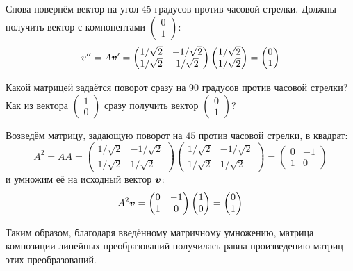 \documentclass[a4paper,12pt]{article}
\begin{document}
\begin{remark}
    Снова повернём вектор на угол $45$ градусов против часовой стрелки.
    Должны получить вектор с компонентами $\left(\begin{smallmatrix}0 \\ 1\end{smallmatrix}\right)$:
    \[
      v''
      = A \boldsymbol v'
      = \begin{pmatrix}
          1/\sqrt{2} & -1/\sqrt{2}\\
          1/\sqrt{2} & 1/\sqrt{2}
        \end{pmatrix}
        \begin{pmatrix}
          1/\sqrt{2} \\ 1/\sqrt{2}
        \end{pmatrix}
      = \begin{pmatrix}
          0 \\ 1
        \end{pmatrix}
    \]
    
    Какой матрицей задаётся поворот сразу на $90$ градусов против часовой стрелки?
    Как из вектора
    $\left(\begin{smallmatrix}1 \\ 0\end{smallmatrix}\right)$
    сразу получить вектор
    $\left(\begin{smallmatrix}0 \\ 1\end{smallmatrix}\right)$?
    
    Возведём матрицу, задающую поворот на $45$ против часовой стрелки, в квадрат:
    \[
      A^2
      = A A
      = \begin{pmatrix}
          1/\sqrt{2} & -1/\sqrt{2}\\
          1/\sqrt{2} & 1/\sqrt{2}
        \end{pmatrix}
        \begin{pmatrix}
          1/\sqrt{2} & -1/\sqrt{2}\\
          1/\sqrt{2} & 1/\sqrt{2}
        \end{pmatrix}
      = \begin{pmatrix}
          0 & -1\\
          1 & 0
        \end{pmatrix}
    \]
    и умножим её на исходный вектор $\boldsymbol v$:
    \[
      A^2 \boldsymbol v
      = \begin{pmatrix}
          0 & -1\\
          1 & 0
        \end{pmatrix}
        \begin{pmatrix}
          1 \\ 0
        \end{pmatrix}
      = \begin{pmatrix}
          0 \\ 1
        \end{pmatrix}
    \]
    
    Таким образом, благодаря введённому матричному умножению, матрица композиции линейных преобразований получилась равна произведению матриц этих преобразований.
  \end{remark}
  
\end{document}
